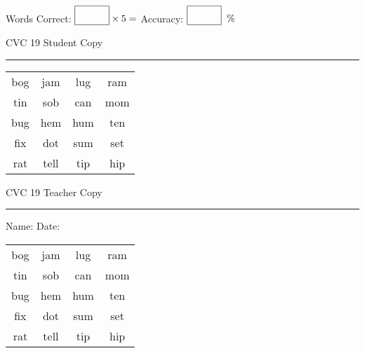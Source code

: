 \documentclass{memoir}
\begin{document}
\normalsize

Words Correct: $\fbox{\phantom{\huge 100}} \times 5 = $ Accuracy: $\fbox{\phantom{\huge 100}}\;\; \%$ 

\vfill

\newpage


\footnotesize \noindent
CVC 19 \hfill Student Copy
\smallskip
\hrule

\huge

\setlength{\tabcolsep}{14pt}
\def\arraystretch{2}

{\selectfont


\begin{vplace}[0.5]
\begin{center}
\begin{tabular}{cccc}
bog & jam & lug & ram \\
tin & sob & can & mom \\
bug & hem & hum & ten \\
fix & dot & sum & set \\
rat & tell & tip & hip \\
\end{tabular}
\end{center}
\end{vplace}

}

\newpage

\footnotesize \noindent
CVC 19 \hfill Teacher Copy
\smallskip
\hrule

\normalsize

\vfill

\noindent
Name: \underline{\hspace{1.75in}} \hfill Date: \underline{\hspace{1in}}

\huge

{\selectfont


\begin{vplace}[0.5]
\begin{center}
\begin{tabular}{cccc}
bog & jam & lug & ram \\
tin & sob & can & mom \\
bug & hem & hum & ten \\
fix & dot & sum & set \\
rat & tell & tip & hip \\
\end{tabular}
\end{center}
\end{vplace}



}
\end{document}
